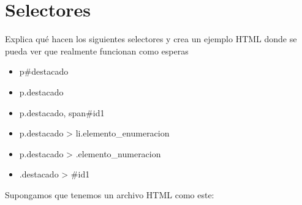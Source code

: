 \documentclass[letterpaper,10pt,spanish]{sphinxmanual}
\begin{document}
\section{Selectores}
\label{\detokenize{tema3:selectores}}
Explica qué hacen los siguientes selectores y crea un ejemplo HTML donde se pueda ver que realmente funcionan como esperas
\begin{itemize}
\item {} 
p\#destacado

\item {} 
p.destacado

\item {} 
p.destacado, span\#id1

\item {} 
p.destacado \textgreater{} li.elemento\_enumeracion

\item {} 
p.destacado \textgreater{} .elemento\_numeracion

\item {} 
.destacado \textgreater{} \#id1

\end{itemize}

Supongamos que tenemos un archivo HTML como este:
\end{document}
